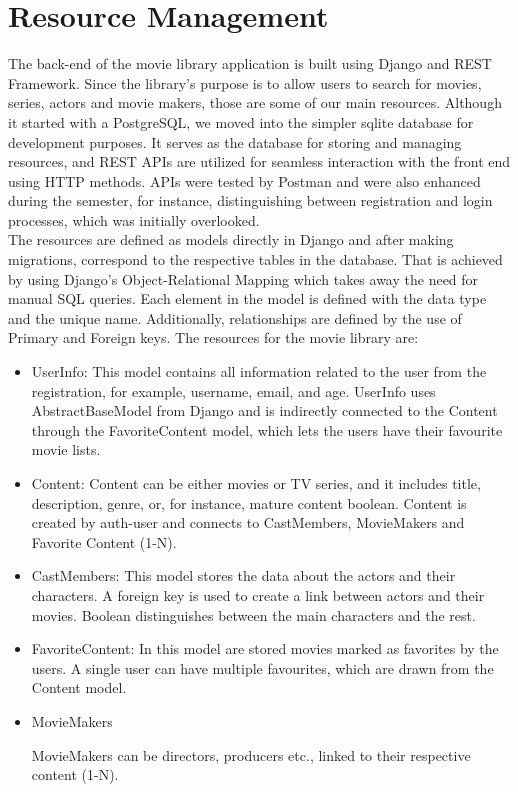 \documentclass[letterpaper,twocolumn]{article}
\begin{document}
\section{Resource Management}

The back-end of the movie library application is built using Django and REST Framework. Since the library's purpose is to allow users to search for movies, series, actors and movie makers, those are some of our main resources. Although it started with a PostgreSQL, we moved into the simpler sqlite database for development purposes. It serves as the database for storing and managing resources, and REST APIs are utilized for seamless interaction with the front end using HTTP methods. APIs were tested by Postman and were also enhanced during the semester, for instance, distinguishing between registration and login processes, which was initially overlooked. \\

The resources are defined as models directly in Django and after making migrations, correspond to the respective tables in the database. That is achieved by using Django's Object-Relational Mapping which takes away the need for manual SQL queries. Each element in the model is defined with the data type and the unique name. Additionally, relationships are defined by the use of Primary and Foreign keys. The resources for the movie library are:

\begin{itemize}
    \item UserInfo: This model contains all information related to the user from the registration, for example, username, email, and age. UserInfo uses AbstractBaseModel from Django and is indirectly connected to the Content through the FavoriteContent model, which lets the users have their favourite movie lists. 

    \item Content: Content can be either movies or TV series, and it includes title, description, genre, or, for instance, mature content boolean. Content is created by auth-user and connects to CastMembers, MovieMakers and Favorite Content (1-N).

    \item CastMembers: This model stores the data about the actors and their characters. A foreign key is used to create a link between actors and their movies. Boolean distinguishes between the main characters and the rest. 

    \item FavoriteContent: In this model are stored movies marked as favorites by the users. A single user can have multiple favourites, which are drawn from the Content model. 

    \item MovieMakers

MovieMakers can be directors, producers etc., linked to their respective content (1-N).
    
\end{itemize}
\end{document}

